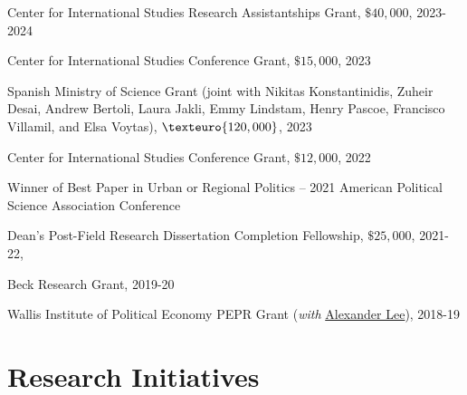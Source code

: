 \documentclass[10pt, letterpaper]{article}
\begin{document}
\begin{etaremune}
\setlength\itemsep{0.05em}

\item Center for International Studies Research Assistantships Grant, $\$40,000$, 2023-2024
\item  Center for International Studies Conference Grant, $\$15,000$, 2023
\item Spanish Ministry of Science Grant (joint with Nikitas Konstantinidis, Zuheir Desai, Andrew
Bertoli, Laura Jakli, Emmy Lindstam, Henry Pascoe, Francisco Villamil, and Elsa Voytas),  $\texteuro{120,000}$, 2023
\item Center for International Studies Conference Grant, $\$12,000$, 2022
	\item Winner of Best Paper in Urban or Regional Politics -- 2021 American Political Science Association Conference
\item Dean’s Post-Field Research Dissertation Completion Fellowship, $\$25,000$, 2021-22, 
\item Beck Research Grant, 2019-20
\item Wallis Institute of Political Economy PEPR Grant (\textit{with} \href{https://www.rochester.edu/college/faculty/alexander_lee/}{Alexander Lee}), 2018-19 

\end{etaremune}



\section*{Research Initiatives}
\end{document}
